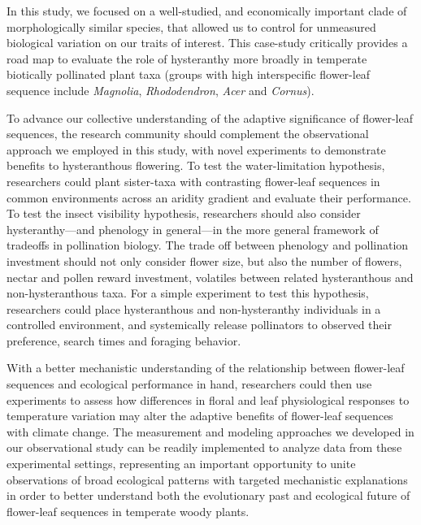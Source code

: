 \documentclass{article}[11pt]
\begin{document}
{In this study, we focused on a well-studied, and economically important clade of morphologically similar species, that allowed us to control for unmeasured biological variation on our traits of interest. This case-study critically provides a road map to evaluate the role of hysteranthy more broadly in temperate biotically pollinated plant taxa (groups with high interspecific flower-leaf sequence include \emph{Magnolia}, \emph{Rhododendron}, \emph{Acer} and \emph{Cornus}). 

To advance our collective understanding of the adaptive significance of flower-leaf sequences, the research community should complement the observational approach we employed in this study, with novel experiments to demonstrate benefits to hysteranthous flowering. To test the water-limitation hypothesis, researchers could plant sister-taxa with contrasting flower-leaf sequences in common environments across an aridity gradient and evaluate their performance. To test the insect visibility hypothesis, researchers should also consider hysteranthy---and phenology in general---in the more general framework of tradeoffs in pollination biology. The trade off between phenology and pollination investment should not only consider flower size, but also the number of flowers, nectar and pollen reward investment, volatiles between related hysteranthous and non-hysteranthous taxa. For a simple experiment to test this hypothesis, researchers could place hysteranthous and non-hysteranthy individuals in a controlled environment, and systemically release pollinators to observed their preference, search times and foraging behavior. 

With a better mechanistic understanding of the relationship between flower-leaf sequences and ecological performance in hand, researchers could then use experiments to assess how differences in floral and leaf physiological responses to temperature variation may alter the adaptive benefits of flower-leaf sequences with climate change. The measurement and modeling approaches we developed in our observational study can be readily implemented to analyze data from these experimental settings, representing an important opportunity to unite observations of broad ecological patterns with targeted mechanistic explanations in order to better understand both the evolutionary past and ecological future of flower-leaf sequences in temperate woody plants.







}
\end{document}
